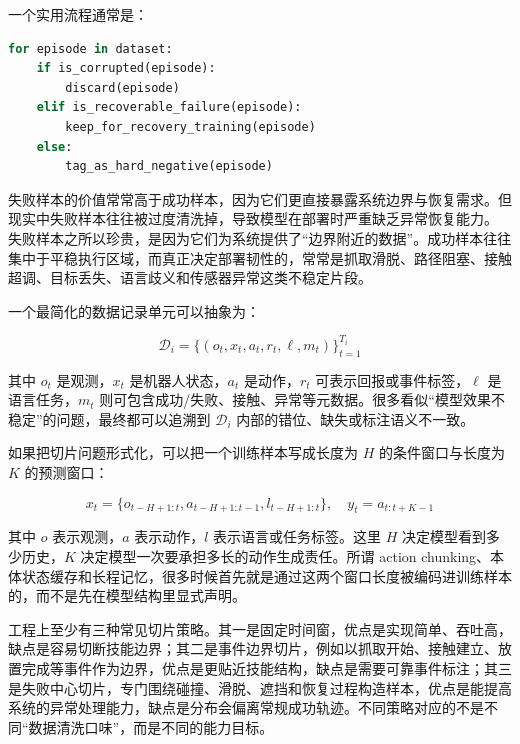 一个实用流程通常是：

\begin{lstlisting}[language=python]
for episode in dataset:
    if is_corrupted(episode):
        discard(episode)
    elif is_recoverable_failure(episode):
        keep_for_recovery_training(episode)
    else:
        tag_as_hard_negative(episode)
\end{lstlisting}

失败样本的价值常常高于成功样本，因为它们更直接暴露系统边界与恢复需求。但现实中失败样本往往被过度清洗掉，导致模型在部署时严重缺乏异常恢复能力。 失败样本之所以珍贵，是因为它们为系统提供了“边界附近的数据”。成功样本往往集中于平稳执行区域，而真正决定部署韧性的，常常是抓取滑脱、路径阻塞、接触超调、目标丢失、语言歧义和传感器异常这类不稳定片段。

一个最简化的数据记录单元可以抽象为：

\begingroup
\footnotesize
\begin{equation*}
\mathcal{D}_i = \{(o_t, x_t, a_t, r_t, \ell, m_t)\}_{t=1}^{T_i}
\end{equation*}
\endgroup

其中 \(o_t\) 是观测，\(x_t\) 是机器人状态，\(a_t\) 是动作，\(r_t\) 可表示回报或事件标签，\(\ell\) 是语言任务，\(m_t\) 则可包含成功/失败、接触、异常等元数据。很多看似“模型效果不稳定”的问题，最终都可以追溯到 \(\mathcal{D}_i\) 内部的错位、缺失或标注语义不一致。

如果把切片问题形式化，可以把一个训练样本写成长度为 \(H\) 的条件窗口与长度为 \(K\) 的预测窗口：

\begingroup
\footnotesize
\begin{equation*}
x_t = \{o_{t-H+1:t}, a_{t-H+1:t-1}, l_{t-H+1:t}\}, \quad
y_t = a_{t:t+K-1}
\end{equation*}
\endgroup

其中 \(o\) 表示观测，\(a\) 表示动作，\(l\) 表示语言或任务标签。这里 \(H\) 决定模型看到多少历史，\(K\) 决定模型一次要承担多长的动作生成责任。所谓 action chunking、本体状态缓存和长程记忆，很多时候首先就是通过这两个窗口长度被编码进训练样本的，而不是先在模型结构里显式声明。

工程上至少有三种常见切片策略。其一是固定时间窗，优点是实现简单、吞吐高，缺点是容易切断技能边界；其二是事件边界切片，例如以抓取开始、接触建立、放置完成等事件作为边界，优点是更贴近技能结构，缺点是需要可靠事件标注；其三是失败中心切片，专门围绕碰撞、滑脱、遮挡和恢复过程构造样本，优点是能提高系统的异常处理能力，缺点是分布会偏离常规成功轨迹。不同策略对应的不是不同“数据清洗口味”，而是不同的能力目标。

